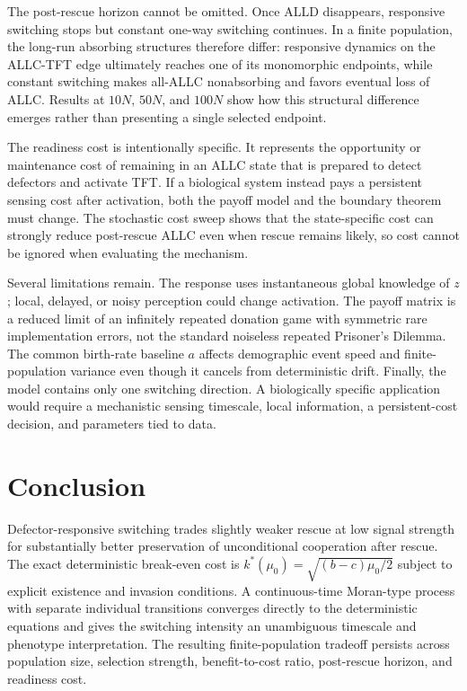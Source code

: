 \documentclass[pdflatex,sn-mathphys-ay]{sn-jnl}
\theoremstyle{thmstyleone}
\begin{document}
The post-rescue horizon cannot be omitted. Once ALLD disappears, responsive switching stops but constant one-way switching continues. In a finite population, the long-run absorbing structures therefore differ: responsive dynamics on the ALLC-TFT edge ultimately reaches one of its monomorphic endpoints, while constant switching makes all-ALLC nonabsorbing and favors eventual loss of ALLC. Results at $10N$, $50N$, and $100N$ show how this structural difference emerges rather than presenting a single selected endpoint.

The readiness cost is intentionally specific. It represents the opportunity or maintenance cost of remaining in an ALLC state that is prepared to detect defectors and activate TFT. If a biological system instead pays a persistent sensing cost after activation, both the payoff model and the boundary theorem must change. The stochastic cost sweep shows that the state-specific cost can strongly reduce post-rescue ALLC even when rescue remains likely, so cost cannot be ignored when evaluating the mechanism.

Several limitations remain. The response uses instantaneous global knowledge of $z$; local, delayed, or noisy perception could change activation. The payoff matrix is a reduced limit of an infinitely repeated donation game with symmetric rare implementation errors, not the standard noiseless repeated Prisoner's Dilemma. The common birth-rate baseline $a$ affects demographic event speed and finite-population variance even though it cancels from deterministic drift. Finally, the model contains only one switching direction. A biologically specific application would require a mechanistic sensing timescale, local information, a persistent-cost decision, and parameters tied to data.

\section{Conclusion}

Defector-responsive switching trades slightly weaker rescue at low signal strength for substantially better preservation of unconditional cooperation after rescue. The exact deterministic break-even cost is $k^*(\mu_0)=\sqrt{(b-c)\mu_0/2}$ subject to explicit existence and invasion conditions. A continuous-time Moran-type process with separate individual transitions converges directly to the deterministic equations and gives the switching intensity an unambiguous timescale and phenotype interpretation. The resulting finite-population tradeoff persists across population size, selection strength, benefit-to-cost ratio, post-rescue horizon, and readiness cost.
\end{document}
